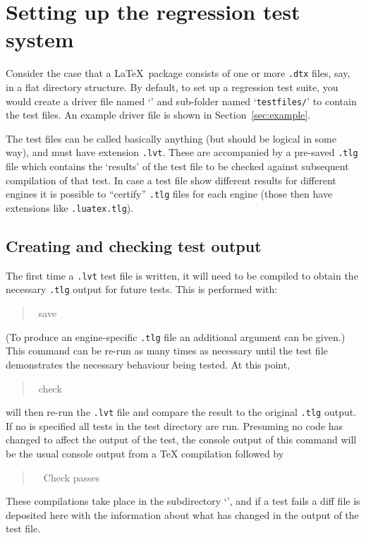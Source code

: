 \documentclass[a4paper]{ltugboat}
\begin{document}
\section{Setting up the regression test system}

Consider the case that a \LaTeX\ package consists of one or more
\texttt{.dtx} files, say, in a flat directory structure.  By default,
to set up a regression test suite, you would create a driver file
named `\texttt{\drivername}' and sub-folder named
`\texttt{testfiles/}' to contain the test files.  An example driver
file is shown in Section~\ref{sec:example}.

The test files can be called basically anything (but should be logical
in some way), and must have extension \texttt{.lvt}.  These are
accompanied by a pre-saved \texttt{.tlg} file which contains the
`results' of the test file to be checked against subsequent
compilation of that test. In case a test file show different results for different engines it is possible to ``certify'' \texttt{.tlg} files for each engine (those then have extensions like \texttt{.luatex.tlg}).


\subsection{Creating and checking test output}

The first time a \texttt{.lvt} test file is written, it will need to
be compiled to obtain the necessary \texttt{.tlg} output for future
tests.  This is performed with:
\begin{quote}\ttfamily
\execname~save~
\end{quote}
(To produce an engine-specific \texttt{.tlg} file an additional
 argument can be given.)  This command can be re-run as
many times as necessary until the test file demonstrates the necessary
behaviour being tested.
%
At this point, 
\begin{quote}\ttfamily
\execname~check~
\end{quote}
will then re-run the \texttt{.lvt} file and compare the result to the
original \texttt{.tlg} output.  
If no  is specified all tests in the test directory are run. Presuming no code has changed to
affect the output of the test, the console output of this command will
be the usual console output from a \TeX{} compilation followed by
\begin{quote}\ttfamily
~~Check passes
\end{quote}
These compilations take place in the subdirectory
`\texttt{\compdirname}', and if a test fails a diff file is deposited
here with the information about what has changed in the output of the
test file.
\end{document}

